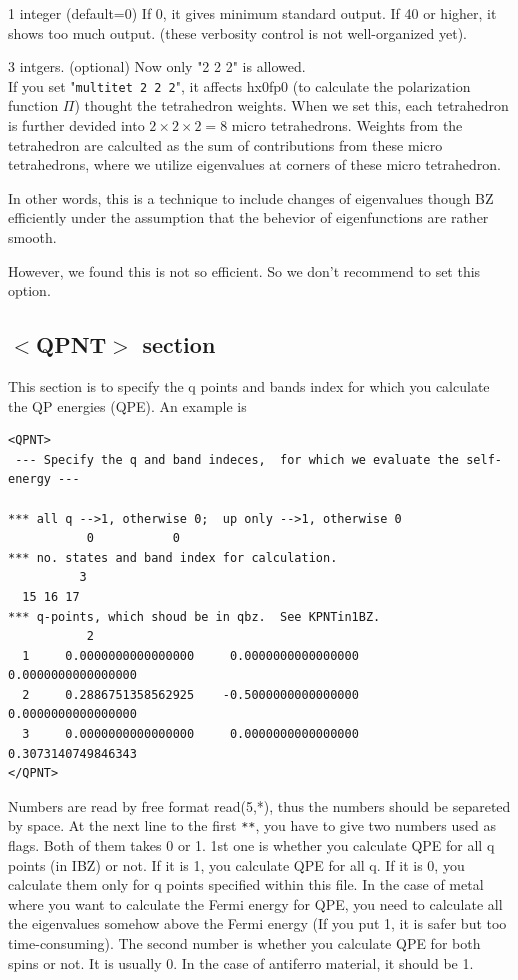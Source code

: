 \documentclass[a4paper,10pt,epsf,fleqn]{article}
\newcommand{\fx}[1]{\subsection{\sf #1\index{\sf #1}}}
\newcommand{\keyw}[1]{\fbox{\tt #1}}
\begin{document}
{\begin{enumerate}
\keyw{Verbose} 1 integer (default=0)
If 0, it gives minimum standard output.
If 40 or higher, it shows too much output.
(these verbosity control is not well-organized yet). 

\keyw{multitet} 3 intgers. (optional) Now only "2 2 2" is allowed.\\
If you set "{\tt multitet  2 2 2}", 
it affects hx0fp0 (to calculate the polarization function $\Pi$) 
thought the tetrahedron weights.
When we set this, each tetrahedron is further devided into $2\times 2\times2=8$ 
micro tetrahedrons. Weights from the tetrahedron are calculted
as the sum of contributions from these micro tetrahedrons,
where we utilize eigenvalues at corners of these micro tetrahedron.

In other words, this is a technique to include changes of eigenvalues
though BZ efficiently under the assumption 
that the behevior of eigenfunctions are rather smooth.

However, we found this is not so efficient.
So we don't recommend to set this option.

\end{enumerate}



\newpage
\fx{$<$QPNT$>$ section} 
This section is to specify the q points and bands index for which you calculate 
the QP energies (QPE). An example is
{\baselineskip=2.6mm
\begin{verbatim}
<QPNT>
 --- Specify the q and band indeces,  for which we evaluate the self-energy ---

*** all q -->1, otherwise 0;  up only -->1, otherwise 0
           0           0
*** no. states and band index for calculation.
          3
  15 16 17 
*** q-points, which shoud be in qbz.  See KPNTin1BZ.
           2
  1     0.0000000000000000     0.0000000000000000     0.0000000000000000
  2     0.2886751358562925    -0.5000000000000000     0.0000000000000000
  3     0.0000000000000000     0.0000000000000000     0.3073140749846343
</QPNT>
\end{verbatim}}
Numbers are read by free format read(5,*), 
thus the numbers should be separeted by space.
At the next line to the first {\tt ***},
you have to give two numbers used as flags. 
Both of them takes 0 or 1.
1st one is whether you calculate QPE for all q points (in IBZ) or not.
If it is 1, you calculate  QPE for all q. If it is 0, you calculate them only for
q points specified within this file. In the case of metal where you want to calculate the Fermi energy for QPE,
you need to calculate all the eigenvalues somehow above the Fermi energy
(If you put 1, it is safer but too time-consuming).
The second number is whether you calculate QPE for
both spins or not. 
It is usually 0. In the case of antiferro material, 
it should be 1.

}
\end{document}
